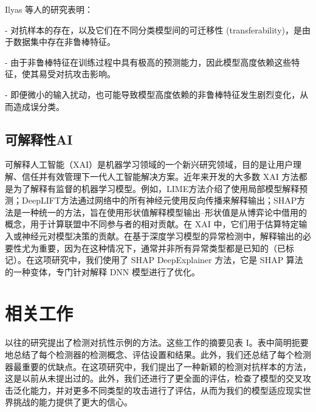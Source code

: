 \documentclass[12pt, a4paper]{ctexart} %
\begin{document}
Ilyas 等人的研究表明：

- 对抗样本的存在，以及它们在不同分类模型间的可迁移性 (transferability)，是由于数据集中存在非鲁棒特征。

- 由于非鲁棒特征在训练过程中具有极高的预测能力，因此模型高度依赖这些特征，使其易受对抗攻击影响。

- 即便微小的输入扰动，也可能导致模型高度依赖的非鲁棒特征发生剧烈变化，从而造成误分类。

\subsection{可解释性AI}
可解释人工智能（XAI）是机器学习领域的一个新兴研究领域，目的是让用户理解、信任并有效管理下一代人工智能解决方案。近年来开发的大多数 XAI 方法都是为了解释有监督的机器学习模型。例如，LIME方法介绍了使用局部模型解释预测；DeepLIFT方法通过网络中的所有神经元使用反向传播来解释输出；SHAP方法是一种统一的方法，旨在使用形状值解释模型输出--形状值是从博弈论中借用的概念，用于计算联盟中不同参与者的相对贡献。在 XAI 中，它们用于估算特定输入或神经元对模型决策的贡献。在基于深度学习模型的异常检测中，解释输出的必要性尤为重要，因为在这种情况下，通常并非所有异常类型都是已知的（已标记）。在这项研究中，我们使用了 SHAP DeepExplainer 方法，它是 SHAP 算法的一种变体，专门针对解释 DNN 模型进行了优化。

\section{相关工作}
以往的研究提出了检测对抗性示例的方法。这些工作的摘要见表 I。表中简明扼要地总结了每个检测器的检测概念、评估设置和结果。此外，我们还总结了每个检测器最重要的优缺点。在这项研究中，我们提出了一种新颖的检测对抗样本的方法，这是以前从未提出过的。此外，我们还进行了更全面的评估，检查了模型的交叉攻击泛化能力，并对更多不同类型的攻击进行了评估，从而为我们的模型适应现实世界挑战的能力提供了更大的信心。
\end{document}

